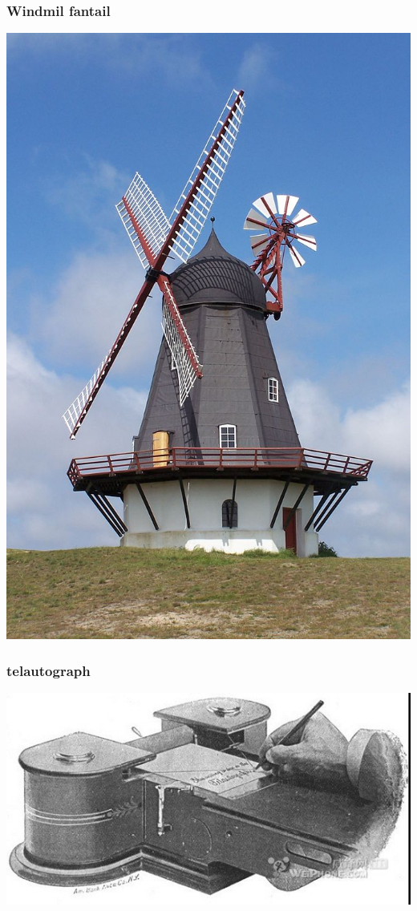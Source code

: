 \documentclass{beamer}
\begin{document}
\begin{frame}
\frametitle{Windmil fantail}
\label{sec-1-5}

\includegraphics[height=\textheight]{image/DK_Fanoe_Windmill01.JPG}
\end{frame}
\begin{frame}
\frametitle{telautograph}
\label{sec-1-6}

\includegraphics[width=\textwidth]{image/telautograph.jpg}
\end{frame}
\end{document}
